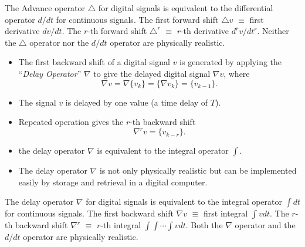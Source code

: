 The Advance operator $\triangle$ for digital signals is equivalent to the
differential operator $d/dt$ for continuous signals. The first forward
shift $\triangle v$ $\equiv$ first derivative $dv/dt$. The $r$-th
forward shift $\triangle^r$ $\equiv$ $r$-th derivative $d^rv/dt^r$. Neither the $\triangle$ operator nor the $d/dt$ operator are
physically realistic.

\begin{slide}
  \label{slide:l7s5}
\begin{itemize}

\item   The first backward shift of a digital signal $v$ is generated by
  applying the ``\emph{Delay Operator}'' $\nabla$  to give the
  delayed  digital signal $\nabla v$, where \[ \nabla v = \nabla
  \{v_k\} = \{\nabla v_k\} = \{v_{k-1}\}.\]
  

\item   The signal $v$ is delayed by one value (a time delay of
  $T$).


\item   Repeated operation gives the $r$-th backward shift \[ \nabla^r v = \{v_{k-r}\}.\]

\item the delay operator $\nabla$ is equivalent to the integral operator
  $\int$.

\item   The delay operator $\nabla$ is not only physically realistic
  but can be implemented easily by storage and retrieval in a digital
  computer.

\end{itemize}
\end{slide}

The delay operator $\nabla$ for digital signals is equivalent to the
integral operator $\int dt$ for continuous signals. The first backward
shift $\nabla v$ $\equiv$ first integral $\int v dt$. The $r$-th
backward shift $\nabla^r$ $\equiv$ $r$-th integral $\int \int \cdots
\int v dt$. Both the $\nabla$ operator and the $d/dt$ operator are
physically realistic.

